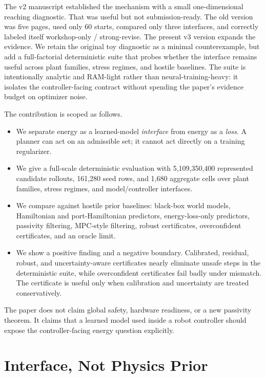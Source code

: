 \documentclass{article}
\newcommand{\fullscale}{5,109,350,400}
\newcommand{\seedrows}{161,280}
\newcommand{\aggrows}{1,680}
\begin{document}
The v2 manuscript established the mechanism with a small one-dimensional reaching diagnostic. That was useful but not submission-ready. The old version was five pages, used only 60 starts, compared only three interfaces, and correctly labeled itself workshop-only / strong-revise. The present v3 version expands the evidence. We retain the original toy diagnostic as a minimal counterexample, but add a full-factorial deterministic suite that probes whether the interface remains useful across plant families, stress regimes, and hostile baselines. The suite is intentionally analytic and RAM-light rather than neural-training-heavy: it isolates the controller-facing contract without spending the paper's evidence budget on optimizer noise.

The contribution is scoped as follows.
\begin{itemize}
    \item We separate energy as a learned-model \emph{interface} from energy as a \emph{loss}. A planner can act on an admissible set; it cannot act directly on a training regularizer.
    \item We give a full-scale deterministic evaluation with \fullscale{} represented candidate rollouts, \seedrows{} seed rows, and \aggrows{} aggregate cells over plant families, stress regimes, and model/controller interfaces.
    \item We compare against hostile prior baselines: black-box world models, Hamiltonian and port-Hamiltonian predictors, energy-loss-only predictors, passivity filtering, MPC-style filtering, robust certificates, overconfident certificates, and an oracle limit.
    \item We show a positive finding and a negative boundary. Calibrated, residual, robust, and uncertainty-aware certificates nearly eliminate unsafe steps in the deterministic suite, while overconfident certificates fail badly under mismatch. The certificate is useful only when calibration and uncertainty are treated conservatively.
\end{itemize}

The paper does not claim global safety, hardware readiness, or a new passivity theorem. It claims that a learned model used inside a robot controller should expose the controller-facing energy question explicitly.

\section{Interface, Not Physics Prior}
\end{document}
